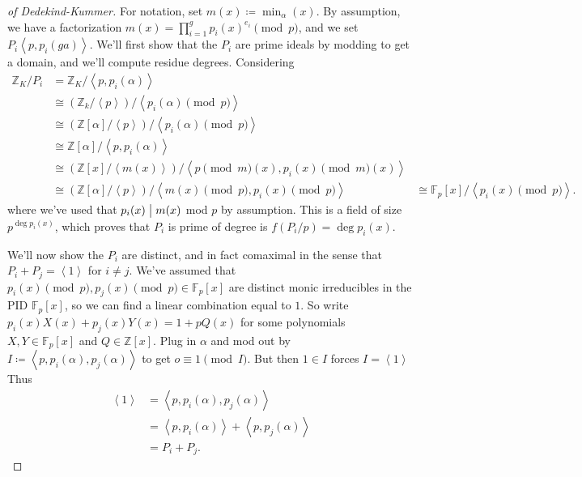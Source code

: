 \begin{proof}[of Dedekind-Kummer]

For notation, set \(m(x) \coloneqq\min_ \alpha(x)\). By assumption, we
have a factorization \(m(x) = \prod_{i=1}^g p_i(x)^{e_i} \pmod p\), and
we set \(P_i \left\langle{ p, p_i( g a) }\right\rangle\). We'll first
show that the \(P_i\) are prime ideals by modding to get a domain, and
we'll compute residue degrees. Considering
\begin{align*}
{\mathbb{Z}}_K/ P_i 
&= {\mathbb{Z}}_K / \left\langle{ p, p_i( \alpha) }\right\rangle \\
&\cong ({\mathbb{Z}}_k / \left\langle{ p }\right\rangle )/ \left\langle{ p_i( \alpha) \pmod p }\right\rangle\\
&\cong ({\mathbb{Z}}[ \alpha] / \left\langle{ p }\right\rangle )/ \left\langle{ p_i( \alpha) \pmod p }\right\rangle\\
&\cong {\mathbb{Z}}[ \alpha] / \left\langle{ p, p_i( \alpha) }\right\rangle \\
&\cong ( {\mathbb{Z}}[x] / \left\langle{ m(x) }\right\rangle ) / \left\langle{ p \pmod m(x), p_i(x) \pmod m(x) }\right\rangle \\
&\cong ( {\mathbb{Z}}[ \alpha] / \left\langle{ p }\right\rangle ) / \left\langle{ m(x) \pmod p, p_i(x) \pmod p }\right\rangle 
&\cong {\mathbb{F}}_p[x] / \left\langle{ p_i(x) \pmod p }\right\rangle 
.\end{align*}
where we've used that \(p_i(x) \bigm|m(x)\) mod \(p\) by assumption.
This is a field of size \(p^{\deg p_i(x)}\), which proves that \(P_i\)
is prime of degree is \(f(P_i / p) = \deg p_i(x)\).

We'll now show the \(P_i\) are distinct, and in fact comaximal in the
sense that \(P_i + P_j = \left\langle{ 1 }\right\rangle\) for
\(i\neq j\). We've assumed that
\(p_i(x) \pmod p, p_j(x) \pmod p \in {\mathbb{F}}_p[x]\) are distinct
monic irreducibles in the PID \({\mathbb{F}}_p[x]\), so we can find a
linear combination equal to \(1\). So write
\(p_i(x) X(x) + p_j(x) Y(x) = 1 + pQ(x)\) for some polynomials
\(X,Y\in {\mathbb{F}}_p[x]\) and \(Q\in {\mathbb{Z}}[ x]\). Plug in
\(\alpha\) and mod out by
\(I \coloneqq\left\langle{ p, p_i( \alpha), p_j( \alpha) }\right\rangle\)
to get \(o \equiv 1 \pmod I\). But then \(1\in I\) forces
\(I = \left\langle{ 1 }\right\rangle\) Thus
\begin{align*}
\left\langle{ 1 }\right\rangle 
&= \left\langle{ p, p_i( \alpha), p_j( \alpha) }\right\rangle \\
&= \left\langle{ p, p_i ( \alpha) }\right\rangle+ \left\langle{ p, p_j( \alpha) }\right\rangle \\
&= P_i + P_j
.\end{align*}


\end{proof}
